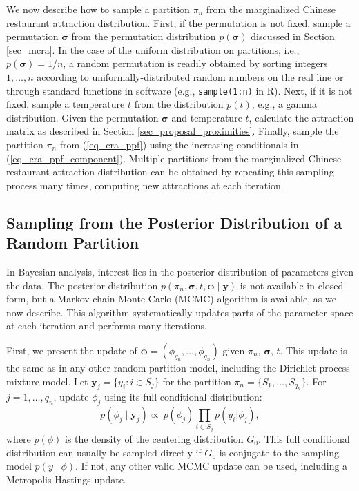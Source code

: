 \documentclass[lineno]{biometrika-dbd}
\newcommand{\partition}{\ensuremath{\pi}}
\newcommand{\given}{\mid}
\begin{document}
We now describe how to sample a partition $\partition_n$ from the marginalized
Chinese restaurant attraction distribution.  First, if the permutation is not
fixed, sample a permutation $\bm{\sigma}$ from the permutation distribution
$p(\bm{\sigma})$ discussed in Section \ref{sec_mcra}.  In the case of the
uniform distribution on partitions, i.e., $p(\bm{\sigma}) = 1/n$, a random
permutation is readily obtained by sorting integers $1,\ldots,n$ according to
uniformally-distributed random numbers on the real line or through standard
functions in software (e.g., \texttt{sample(1:n)} in R).  Next, if it is not
fixed, sample a temperature $t$ from the distribution $p(t)$, e.g., a gamma
distribution.  Given the permutation $\bm{\sigma}$ and temperature $t$,
calculate the attraction matrix as described in Section
\ref{sec_proposal_proximities}.  Finally, sample the partition $\partition_n$
from (\ref{eq_cra_ppf}) using the increasing conditionals in
(\ref{eq_cra_ppf_component}).  Multiple partitions from the marginalized
Chinese restaurant attraction distribution can be obtained by repeating this
sampling process many times, computing new attractions at each iteration.

\subsection{Sampling from the Posterior Distribution of a Random Partition}

In Bayesian analysis, interest lies in the posterior distribution of parameters
given the data.  The posterior distribution $p(\partition_n, \bm{\sigma}, t,
\bm{\phi} \given \bm{y})$ is not available in closed-form, but a Markov chain
Monte Carlo (MCMC) algorithm is available, as we now describe.  This algorithm
systematically updates parts of the parameter space at each iteration and
performs many iterations.

First, we present the update of $\bm{\phi} = (\phi_{q_n},\ldots,\phi_{q_n})$
given $\partition_n$, $\bm{\sigma}$, $t$.  This update is the same as in any other random partition
model, including the Dirichlet process mixture model.  Let $\bm{y}_j = \{y_i :
i \in S_j\}$ for the partition $\partition_n = \{ S_1, \ldots, S_{q_n} \}$.
For $j=1,\dots,q_n$, update $\phi_j$ using its full conditional distribution:
\begin{equation}
p(\phi_j \given \bm{y}_j) \propto \ p(\phi_j) \prod_{i \in S_j} p(y_i | \phi_j),
\end{equation}
where $p(\phi)$ is the density of the centering distribution $G_0$.  This full
conditional distribution can usually be sampled
directly if $G_0$ is conjugate to the sampling model $p(y \given \phi)$.  If not,
any other valid MCMC update can be used, including a Metropolis Hastings update.
\end{document}
